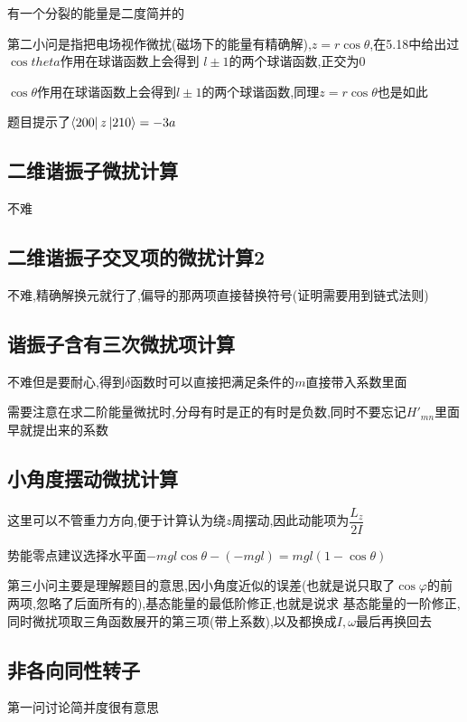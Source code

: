 \documentclass{article}
\begin{document}
            有一个分裂的能量是二度简并的

            第二小问是指把电场视作微扰(磁场下的能量有精确解),$ z = r\cos{\theta} $,在5.18中给出过$\cos{theta}$作用在球谐函数上会得到
            $l \pm 1$的两个球谐函数,正交为0

            \begin{formal}
                $\cos{\theta}$作用在球谐函数上会得到$l \pm 1$的两个球谐函数,同理$z = r\cos{\theta}$也是如此
            \end{formal}

            题目提示了$ \bra{200} z \ket{210} = -3a $

        \subsection{二维谐振子微扰计算}
            不难
        
        \subsection{二维谐振子交叉项的微扰计算2}
            不难,精确解换元就行了,偏导的那两项直接替换符号(证明需要用到链式法则)
            
        \subsection{谐振子含有三次微扰项计算}
            不难但是要耐心,得到$\delta$函数时可以直接把满足条件的$m$直接带入系数里面

            需要注意在求二阶能量微扰时,分母有时是正的有时是负数,同时不要忘记$H'_{mn}$里面早就提出来的系数

        \subsection{小角度摆动微扰计算}
            这里可以不管重力方向,便于计算认为绕$z$周摆动,因此动能项为$\dfrac{L_{z}}{2I}$

            势能零点建议选择水平面$ -mgl\cos{\theta} - (-mgl) = mgl(1-\cos{\theta})$

            第三小问主要是理解题目的意思,因小角度近似的误差(也就是说只取了$\cos{\varphi}$的前两项,忽略了后面所有的),基态能量的最低阶修正,也就是说求
            基态能量的一阶修正,同时微扰项取三角函数展开的第三项(带上系数),以及都换成$I,\omega$最后再换回去

        \subsection{非各向同性转子}
            第一问讨论简并度很有意思
\end{document}
